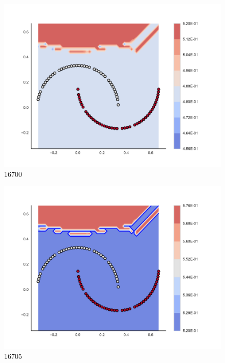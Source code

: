 \begin{subfigure}[b]{0.09\textwidth}
    \includegraphics[clip, trim=2.35cm 1.75cm 4.5cm 0cm,width=\textwidth]{img/convergence/16700.pdf}
    \caption{16700}
    \label{fig:convergence_16700}
\end{subfigure}
%
\begin{subfigure}[b]{0.09\textwidth}
    \includegraphics[clip, trim=2.35cm 1.75cm 4.5cm 0cm,width=\textwidth]{img/convergence/16705.pdf}
    \caption{16705}
    \label{fig:convergence_16705}
\end{subfigure}
%
